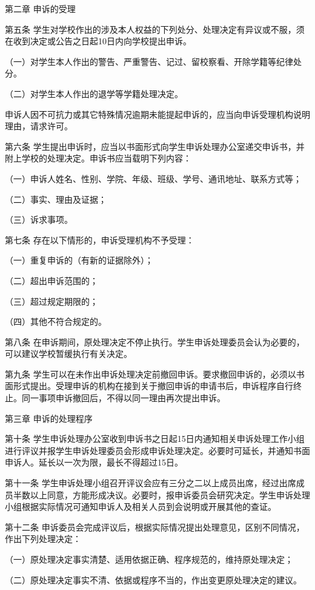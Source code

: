 \documentclass[UTF8,12pt,a4paper]{report}
\begin{document}
第二章  申诉的受理

第五条  学生对学校作出的涉及本人权益的下列处分、处理决定有异议或不服，须在收到决定或公告之日起10日内向学校提出申诉。

（一）对学生本人作出的警告、严重警告、记过、留校察看、开除学籍等纪律处分。

（二）对学生本人作出的退学等学籍处理决定。

申诉人因不可抗力或其它特殊情况逾期未能提起申诉的，应当向申诉受理机构说明理由，请求许可。

第六条  学生提出申诉时，应当以书面形式向学生申诉处理办公室递交申诉书，并附上学校的处理决定。申诉书应当载明下列内容：

（一）申诉人姓名、性别、学院、年级、班级、学号、通讯地址、联系方式等；

（二）事实、理由及证据；

（三）诉求事项。

第七条  存在以下情形的，申诉受理机构不予受理：

（一）重复申诉的（有新的证据除外）；

（二）超出申诉范围的；

（三）超过规定期限的；

（四）其他不符合规定的。

第八条  在申诉期间，原处理决定不停止执行。学生申诉处理委员会认为必要的，可以建议学校暂缓执行有关决定。

第九条  学生可以在未作出申诉处理决定前撤回申诉。要求撤回申诉的，必须以书面形式提出。受理申诉的机构在接到关于撤回申诉的申请书后，申诉程序自行终止。同一事项申诉撤回后，不得以同一理由再次提出申诉。



第三章  申诉的处理程序

第十条  学生申诉处理办公室收到申诉书之日起15日内通知相关申诉处理工作小组进行评议并报学生申诉处理委员会形成申诉处理决定。必要时可延长，并通知书面申诉人。延长以一次为限，最长不得超过15日。

第十一条  学生申诉处理小组召开评议会应有三分之二以上成员出席，经过出席成员半数以上同意，方能形成决议。必要时，报申诉委员会研究决定。学生申诉处理小组根据实际情况可通知申诉人及相关人员到会说明或开展其他的查证。

第十二条  申诉委员会完成评议后，根据实际情况提出处理意见，区别不同情况，作出下列处理决定：

（一）原处理决定事实清楚、适用依据正确、程序规范的，维持原处理决定；

（二）原处理决定事实不清、依据或程序不当的，作出变更原处理决定的建议。
\end{document}
